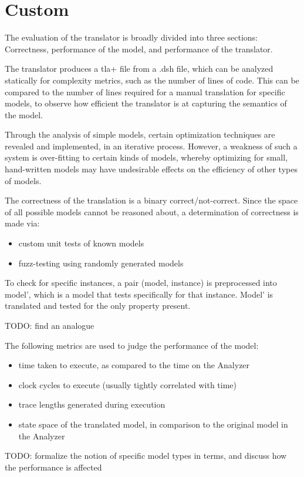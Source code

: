 \chapter{Custom}

The evaluation of the translator is broadly divided into three sections: Correctness, performance of the model, and performance of the translator.

The translator produces a tla+ file from a .dsh file, which can be analyzed statically for complexity metrics, such as the number of lines of code. This can be compared to the number of lines required for a manual translation for specific models, to observe how efficient the translator is at capturing the semantics of the model.

Through the analysis of simple models, certain optimization techniques are revealed and implemented, in an iterative process. However, a weakness of such a system is over-fitting to certain kinds of models, whereby optimizing for small, hand-written models may have undesirable effects on the efficiency of other types of models.

The correctness of the translation is a binary correct/not-correct. Since the space of all possible models cannot be reasoned about, a determination of correctness is made via:

\begin{itemize}
\item custom unit tests of known models
\item fuzz-testing using randomly generated models
\end{itemize}

To check for specific instances, a pair (model, instance) is preprocessed into model', which is a model that tests specifically for that instance. Model' is translated and tested for the only property present.

TODO: find an analogue

The following metrics are used to judge the performance of the model:

\begin{itemize}
	\item time taken to execute, as compared to the time on the Analyzer
	\item clock cycles to execute (usually tightly correlated with time)
	\item trace lengths generated during execution
	\item state space of the translated model, in comparison to the original model in the Analyzer
\end{itemize}


TODO: formalize the notion of specific model types in terms, and discuss how the performance is affected